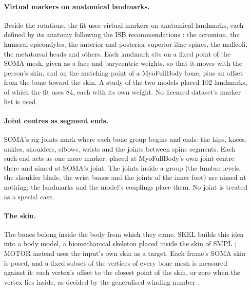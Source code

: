 \documentclass[11pt]{article}
\begin{document}
\paragraph{Virtual markers on anatomical landmarks.} Beside the rotations, the fit uses virtual markers on anatomical
landmarks, each defined by its anatomy following the ISB recommendations \cite{wu2002isb,wu2005isb}: the acromion, the
humeral epicondyles, the anterior and posterior superior iliac spines, the malleoli, the metatarsal heads and others.
Each landmark sits on a fixed point of the SOMA mesh, given as a face and barycentric weights, so that it moves with
the person's skin, and on the matching point of a MyoFullBody bone, plus an offset from the bone toward the skin. A
study of the two models placed 102 landmarks, of which the fit uses 84, each with its own weight. No licensed
dataset's marker list is used.

\paragraph{Joint centres as segment ends.} SOMA's rig joints mark where each bone group begins and ends: the hips,
knees, ankles, shoulders, elbows, wrists and the joints between spine segments. Each such end acts as one more marker,
placed at MyoFullBody's own joint centre there and aimed at SOMA's joint. The joints inside a group (the lumbar
levels, the shoulder blade, the wrist bones and the joints of the inner foot) are aimed at nothing; the landmarks and
the model's couplings place them. No joint is treated as a special case.

\paragraph{The skin.} The bones belong inside the body from which they came. SKEL builds this idea into a body model,
a biomechanical skeleton placed inside the skin of SMPL \cite{keller2023skel}; MOTOR instead uses the input's own skin
as a target. Each frame's SOMA skin is posed, and a fixed subset of the vertices of every bone mesh is measured against
it: each vertex's offset to the closest point of the skin, or zero when the vertex lies inside, as decided by the
generalised winding number \cite{jacobson2013winding}.
\end{document}
